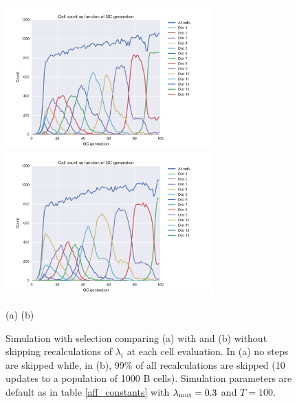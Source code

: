 \begin{figure}[!ht]
\begin{center}
\includegraphics[width=80mm]{figures/sim_selection_default_run_dist10.pdf}
\hspace{-22mm}
\includegraphics[width=80mm]{figures/sim_selection_default_run_dist10_no_skip.pdf} \newline%
\end{center}
\vspace{-9mm} \hspace{34mm} (a) \hspace{53mm} (b)
    \caption{
        \label{fig:skip_vs_no_skip_dist10}
        Simulation with selection comparing (a) with and (b) without skipping recalculations of $\lambda_i$ at each cell evaluation.
        In (a) no steps are skipped while, in (b), 99\% of all recalculations are skipped (10 updates to a population of 1000 B cells).
        Simulation parameters are default as in table \ref{aff_constants} with $\lambda_{\text{mut}} = 0.3$ and $T=100$.
        }
\end{figure}


